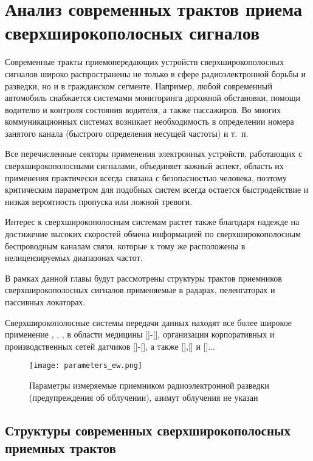 \chapter{Анализ современных трактов приема сверхширокополосных сигналов}

Современные тракты приемопередающих устройств сверхширокополосных сигналов широко распространены не только в сфере радиоэлектронной борьбы и разведки, но и в гражданском сегменте. Например, любой современный автомобиль снабжается системами мониторинга дорожной обстановки, помощи водителю и контроля состояния водителя, а также пассажиров. Во многих коммуникационных системах возникает необходимость в определении номера занятого канала (быстрого определения несущей частоты) и т.~п.

Все перечисленные секторы применения электронных устройств, работающих с сверхширокополосными сигналами, объединяет важный аспект, область их применения практически всегда связана с безопасностью человека, поэтому критическим параметром для подобных систем всегда остается быстродействие и низкая вероятность пропуска или ложной тревоги.

Интерес к сверхширокополосным системам растет также благодаря надежде на достижение высоких скоростей обмена информацией по сверхширокополосным беспроводным каналам связи, которые к тому же расположены в нелицензируемых диапазонах частот.

В рамках данной главы будут рассмотрены структуры трактов приемников сверхширокополосных сигналов применяемые в радарах, пеленгаторах и пассивных локаторах.

Сверхширокополосные системы передачи данных находят все более широкое применение \cite{wosbib1}, \cite{vakbib1}, \cite{vakbib2}, \cite{scbib1} в области медицины []-[], организации корпоративных и производственных сетей датчиков []-[], а также [],[] и []...

\begin{figure}[ht]
	\centering
	\texttt{[image: parameters\_ew.png]}
	\caption{Параметры измеряемые приемником радиоэлектронной разведки (предупреждения об облучении), азимут облучения не указан}
	\label{fig: parameters_ew}
\end{figure}

\section{Структуры современных сверхширокополосных приемных трактов}

